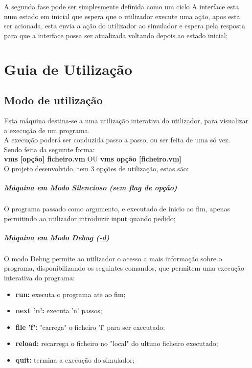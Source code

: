 \documentclass{report}
\begin{document}
\quad A segunda fase pode ser simplesmente definida como um ciclo
 A interface esta num estado em inicial que espera que o utilizador execute uma ação, apos esta ser acionada,
 esta envia a ação do utilizador ao simulador e espera pela resposta para que a interface possa ser atualizada
 voltando depois ao estado inicial;

\chapter{Guia de Utilização}
\section{Modo de utilização}
\quad Esta máquina destina-se a uma utilização interativa do utilizador, para visualizar a execução de um programa.\\
A execução poderá ser conduzida passo a passo, ou ser feita de uma só vez.\\
Sendo feita da seguinte forma:\\

\quad \textbf{vms [opção] ficheiro.vm} OU \textbf{vms opção [ficheiro.vm]}\\

O projeto desenvolvido, tem 3 opções de utilização, estas são:
\paragraph{\quad Máquina em Modo Silencioso (sem flag de opção)}
	O programa passado como argumento, e executado de inicio ao fim, apenas permitindo ao utilizador introduzir input quando pedido;
\paragraph{\quad Máquina em Modo Debug (-d)}
	O modo Debug permite ao utilizador o acesso a mais informação sobre o programa, disponibilizando
  os seguintes comandos, que permitem uma execução interativa do programa:
\begin{itemize}
	\item \textbf{run:} executa o programa ate ao fim;
	\item \textbf{next 'n':} executa 'n' passos;
	\item \textbf{file 'f':} "carrega" o ficheiro 'f' para ser executado;
	\item \textbf{reload:} recarrega o ficheiro no "local" do ultimo ficheiro executado;
	\item \textbf{quit:} termina a execução do simulador;
\end{itemize}
\end{document}
